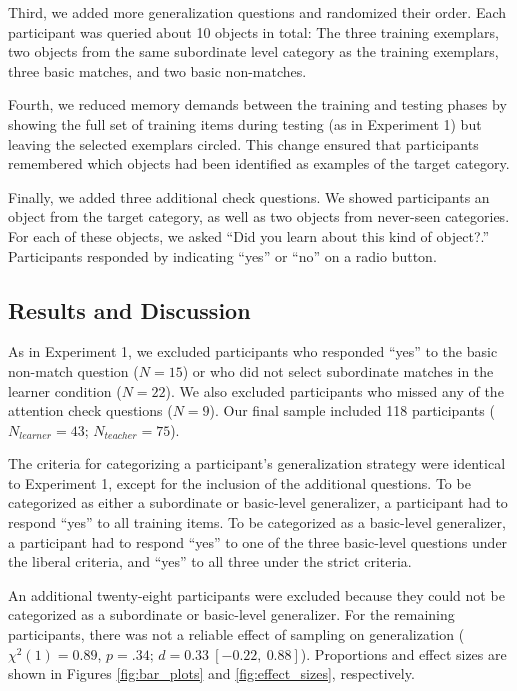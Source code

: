 \documentclass[man]{apa2}
\begin{document}
Third, we added more generalization questions and randomized their order. Each participant was queried about 10 objects in total: The three training exemplars, two objects from the same subordinate level category as the training exemplars, three basic matches, and two basic non-matches. 

Fourth, we reduced memory demands between the training and testing phases by showing the full set of training items during testing (as in Experiment 1) but leaving the selected exemplars circled. This change ensured that participants remembered which objects had been identified as examples of the target category. 

Finally, we added three additional check questions. We showed participants an object from the target category, as well as two objects from never-seen categories. For each of these objects, we asked ``Did you learn about this kind of object?.'' Participants responded by indicating ``yes'' or ``no'' on a radio button.

\subsection{Results and Discussion}
As in Experiment 1, we excluded participants who responded ``yes'' to the basic non-match question ($N=15$) or who did not select subordinate matches in the learner condition ($N = 22$). We also excluded participants who missed any of the attention check questions ($N = 9$). Our final sample included 118 participants ($N_{learner} = 43$; $N_{teacher} = 75$).

The criteria for categorizing a participant's generalization strategy were identical to Experiment 1, except for the inclusion of the additional questions. To be categorized as either a subordinate or basic-level generalizer, a participant had to respond ``yes'' to all training items. To be categorized as a basic-level generalizer, a participant had to respond ``yes'' to one of the three basic-level questions under the liberal criteria, and ``yes'' to all three under the strict criteria. 

An additional twenty-eight participants were excluded because they could not be categorized as a subordinate or basic-level generalizer. For the remaining participants, there was not a reliable effect of sampling on generalization ($\chi^2(1) = 0.89$, $p = .34$; $d = 0.33\ [-0.22,\ 0.88]$). Proportions and effect sizes are shown in Figures \ref{fig:bar_plots} and \ref{fig:effect_sizes}, respectively.
\end{document}
